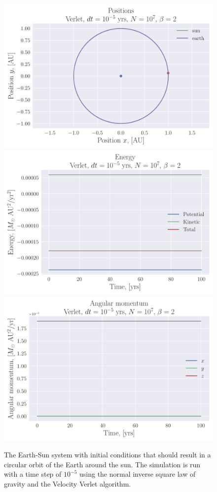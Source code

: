 \documentclass[reprint, english,notitlepage,nofootinbib]{revtex4-1}  %
\begin{document}
\begin{figure}
  \includegraphics[width=\linewidth]{../output/earth_sun_circ-verlet-5-7-2.pdf}
  \includegraphics[width=\linewidth]{../output/earth_sun_circ-verlet-5-7-2_energy.pdf}
  \includegraphics[width=\linewidth]{../output/earth_sun_circ-verlet-5-7-2_ang_mom.pdf}
  \caption{The Earth-Sun system with initial conditions that should result in a circular orbit of the Earth around the sun. The simulation is run with a time step of $10^{-5}$ using the normal inverse square law of gravity and the Velocity Verlet algorithm.}
  \label{fig:earth_sun_circ_verlet}
\end{figure}
\end{document}
